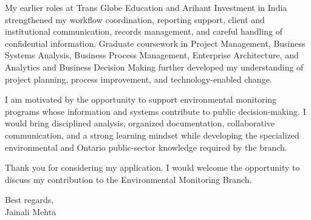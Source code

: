 \documentclass[letterpaper,10pt]{article}
\begin{document}
My earlier roles at Trans Globe Education and Arihant Investment in India strengthened my workflow coordination, reporting support, client and institutional communication, records management, and careful handling of confidential information. Graduate coursework in Project Management, Business Systems Analysis, Business Process Management, Enterprise Architecture, and Analytics and Business Decision Making further developed my understanding of project planning, process improvement, and technology-enabled change.

I am motivated by the opportunity to support environmental monitoring programs whose information and systems contribute to public decision-making. I would bring disciplined analysis, organized documentation, collaborative communication, and a strong learning mindset while developing the specialized environmental and Ontario public-sector knowledge required by the branch.

Thank you for considering my application. I would welcome the opportunity to discuss my contribution to the Environmental Monitoring Branch.

Best regards,\\[8pt]
Jainali Mehta
\end{document}
